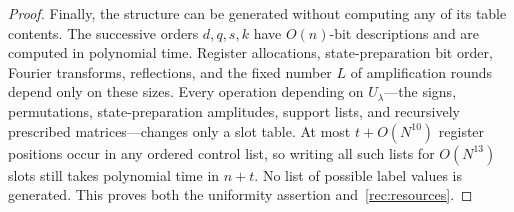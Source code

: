 \begin{proof}
Finally, the structure can be generated without computing any of its table
contents.  The successive orders $d,q,s,k$ have $O(n)$-bit descriptions and
are computed in polynomial time.  Register allocations, state-preparation
bit order, Fourier transforms, reflections, and the fixed number $L$ of
amplification rounds depend only on these sizes.  Every operation depending
on $U_\lambda$---the signs, permutations, state-preparation amplitudes,
support lists, and recursively prescribed matrices---changes only a slot
table.  At most $t+O(N^{10})$ register positions occur in any ordered control
list, so writing all such lists for $O(N^{13})$ slots still takes polynomial
time in $n+t$.  No list of possible label values is generated.  This proves
both the uniformity assertion and~\eqref{rec:resources}.
\end{proof}

